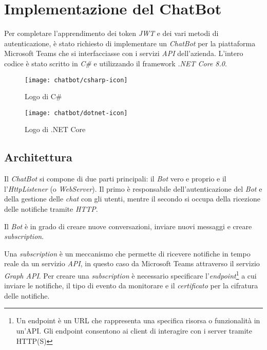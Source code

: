 \chapter{Implementazione del ChatBot}
\label{cap:chatbot}

Per completare l'apprendimento dei token \emph{JWT} e dei vari metodi di autenticazione, è stato richiesto di implementare un \emph{ChatBot} per la piattaforma Microsoft Teams che si interfacciasse con i servizi \emph{API} dell'azienda.
L'intero codice è stato scritto in \emph{C\#} e utilizzando il framework \emph{.NET Core 8.0}.

\bigskip

\begin{figure}[!ht]
    \centering
    \begin{minipage}[t]{0.5\textwidth}
        \centering
        \texttt{[image: chatbot/csharp-icon]}
        \caption{Logo di C\#}
    \end{minipage}\hfill
    \begin{minipage}[t]{0.5\textwidth}
        \centering
        \texttt{[image: chatbot/dotnet-icon]}
        \caption{Logo di .NET Core}
    \end{minipage}
\end{figure}

\section{Architettura}

Il \emph{ChatBot} si compone di due parti principali: il \emph{Bot} vero e proprio e il l'\emph{HttpListener} (o \emph{WebServer}). 
Il primo è responsabile dell'autenticazione del \emph{Bot} e della gestione delle \emph{chat} con gli utenti, mentre il secondo si occupa della ricezione delle notifiche tramite \emph{HTTP}.

Il \emph{Bot} è in grado di creare nuove conversazioni, inviare nuovi messaggi e creare \emph{subscription}.

Una \emph{subscription} è un meccanismo che permette di ricevere notifiche in tempo reale da un servizio \emph{API}, in questo caso da Microsoft Teams attraverso il servizio \emph{Graph API}.
Per creare una \emph{subscription} è necessario specificare l'\emph{endpoint}\footnote{Un endpoint è un URL che rappresenta una specifica risorsa o funzionalità in un'API. Gli endpoint consentono ai client di interagire con i server tramite HTTP(S)} a cui inviare le notifiche, il tipo di evento da monitorare e il \emph{certificato} per la cifratura delle notifiche.

